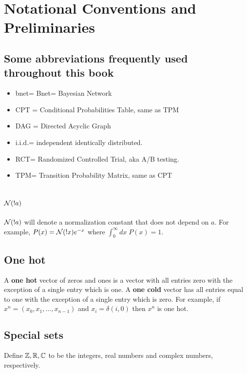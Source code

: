 \chapter*{Notational Conventions and Preliminaries}

\label{ch-not-cons}
\section{Some abbreviations frequently
used throughout this book}

\begin{itemize}
\item
bnet= Bnet= Bayesian Network
\item
CPT = Conditional Probabilities Table,
 same as TPM
\item
DAG = Directed Acyclic Graph
\item
i.i.d.= independent identically 
distributed.
 \item
 RCT= Randomized Controlled Trial,
aka A/B testing.

\item
TPM= Transition Probability Matrix,
same as CPT

\end{itemize}

\section{${\cal N}(!a)$}
${\cal N}(!a)$ will denote 
a normalization constant that does not depend
on $a$. For example, $P(x)={\cal N}(!x)e^{-x}$
where $\int_0^\infty dx \;P(x)=1$.

\section{One hot}
A {\bf one hot } vector of zeros and 
ones is a vector with all entries 
zero with
the exception of a single entry which is one.
A {\bf one cold} vector has all entries
equal to one with the exception of  a
single entry which is zero.
For example, if $x^n=(x_0, x_1, \ldots,
x_{n-1})$ and
$x_i=\delta(i,0)$ then $x^n$ is one hot.


\section{Special sets}
Define ${\mathbb{Z}}, { \mathbb{R}}, { \mathbb{C}}$ to be
 the integers, real numbers
 and complex numbers, respectively. 

